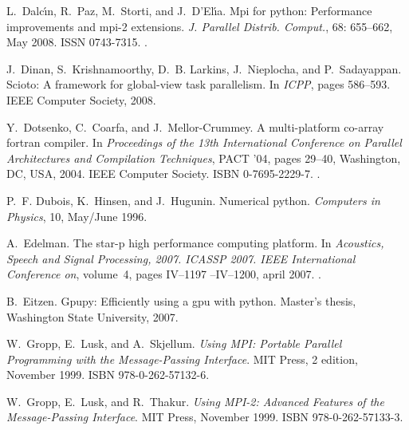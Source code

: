 \documentclass{sigplanconf}
\begin{document}
\begin{thebibliography}{36}
L.~Dalc\'{\i}n, R.~Paz, M.~Storti, and J.~D'El\'{\i}a.
\newblock Mpi for python: Performance improvements and mpi-2 extensions.
\newblock \emph{J. Parallel Distrib. Comput.}, 68: 655--662, May 2008.
\newblock ISSN 0743-7315.
\newblock {}.

J.~Dinan, S.~Krishnamoorthy, D.~B. Larkins, J.~Nieplocha, and P.~Sadayappan.
\newblock Scioto: A framework for global-view task parallelism.
\newblock In \emph{ICPP}, pages 586--593. IEEE Computer Society, 2008.

Y.~Dotsenko, C.~Coarfa, and J.~Mellor-Crummey.
\newblock A multi-platform co-array fortran compiler.
\newblock In \emph{Proceedings of the 13th International Conference on Parallel
  Architectures and Compilation Techniques}, PACT '04, pages 29--40,
  Washington, DC, USA, 2004. IEEE Computer Society.
\newblock ISBN 0-7695-2229-7.
\newblock {}.

P.~F. Dubois, K.~Hinsen, and J.~Hugunin.
\newblock Numerical python.
\newblock \emph{Computers in Physics}, 10, May/June 1996.

A.~Edelman.
\newblock The star-p high performance computing platform.
\newblock In \emph{Acoustics, Speech and Signal Processing, 2007. ICASSP 2007.
  IEEE International Conference on}, volume~4, pages IV--1197 --IV--1200, april
  2007.
\newblock {}.

B.~Eitzen.
\newblock Gpupy: Efficiently using a gpu with python.
\newblock Master's thesis, Washington State University, 2007.

W.~Gropp, E.~Lusk, and A.~Skjellum.
\newblock \emph{Using MPI: Portable Parallel Programming with the
  Message-Passing Interface}.
\newblock MIT Press, 2 edition, November 1999{}.
\newblock ISBN 978-0-262-57132-6.

W.~Gropp, E.~Lusk, and R.~Thakur.
\newblock \emph{Using MPI-2: Advanced Features of the Message-Passing
  Interface}.
\newblock MIT Press, November 1999{}.
\newblock ISBN 978-0-262-57133-3.


\end{thebibliography}
\end{document}
